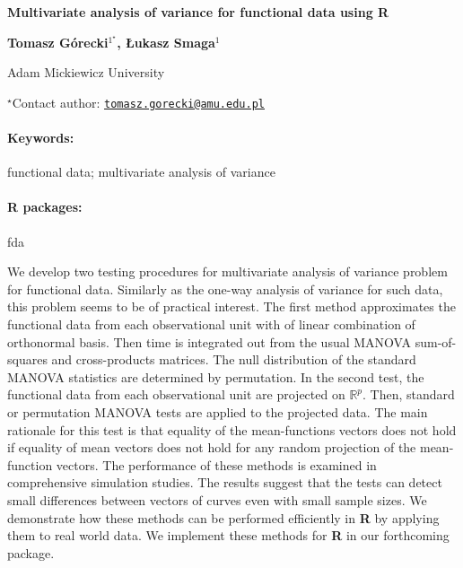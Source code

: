 \documentclass[11pt, a4paper]{article}
\renewcommand{\title}[1]{\begin{center}{\bf \LARGE #1}\end{center}}
\newcommand{\keywords}{\paragraph{Keywords:}}
\newcommand{\packages}{\paragraph{R packages:}}
\begin{document}
\pagestyle{empty}

\title{Multivariate analysis of variance for functional data using R}

\begin{center}
  {\bf Tomasz Górecki$^{1^\star}$, Łukasz Smaga$^{1}$}
\end{center}

\vskip 0.3cm

\begin{affiliations}
\begin{enumerate}
\begin{minipage}{0.915\textwidth}
\centering
\item Adam Mickiewicz University \\[-2pt]
\end{minipage}
\end{enumerate}
$^\star$Contact author: \href{mailto:tomasz.gorecki@amu.edu.pl}{\nolinkurl{tomasz.gorecki@amu.edu.pl}}\\
\end{affiliations}

\vskip 0.5cm

\begin{minipage}{0.915\textwidth}
\keywords functional data; multivariate analysis of variance
\packages fda
\end{minipage}

\vskip 0.8cm

We develop two testing procedures for multivariate analysis of variance
problem for functional data. Similarly as the one-way analysis of
variance for such data, this problem seems to be of practical interest.
The first method approximates the functional data from each
observational unit with of linear combination of orthonormal basis. Then
time is integrated out from the usual MANOVA sum-of-squares and
cross-products matrices. The null distribution of the standard MANOVA
statistics are determined by permutation. In the second test, the
functional data from each observational unit are projected on
\(\mathbb{R}^p\). Then, standard or permutation MANOVA tests are applied
to the projected data. The main rationale for this test is that equality
of the mean-functions vectors does not hold if equality of mean vectors
does not hold for any random projection of the mean-function vectors.
The performance of these methods is examined in comprehensive simulation
studies. The results suggest that the tests can detect small differences
between vectors of curves even with small sample sizes. We demonstrate
how these methods can be performed efficiently in \textbf{R} by applying
them to real world data. We implement these methods for \textbf{R} in
our forthcoming package.
\end{document}
